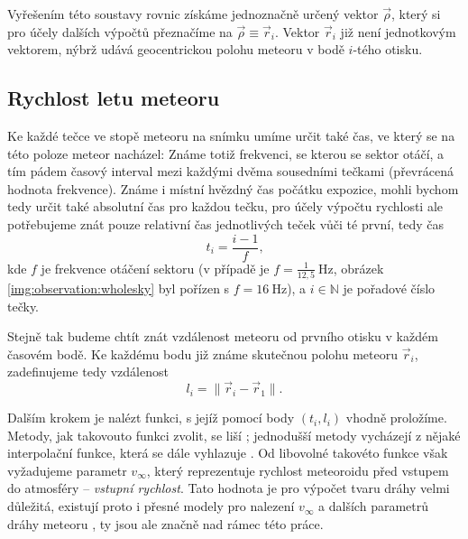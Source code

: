 Vyřešením této soustavy rovnic získáme jednoznačně určený vektor $\vec{\rho}$, který si pro účely dalších výpočtů přeznačíme na $\vec{\rho}\equiv\vec{r}_i$. Vektor $\vec{r}_i$ již není jednotkovým vektorem, nýbrž udává geocentrickou polohu meteoru v bodě $i$-tého otisku.%

\subsection{Rychlost letu meteoru}%
Ke každé tečce ve stopě meteoru na snímku umíme určit také čas, ve který se na této poloze meteor nacházel: Známe totiž frekvenci, se kterou se sektor otáčí, a tím pádem časový interval mezi každými dvěma sousedními tečkami (převrácená hodnota frekvence). Známe i místní hvězdný čas počátku expozice, mohli bychom tedy určit také absolutní čas pro každou tečku, pro účely výpočtu rychlosti ale potřebujeme znát pouze relativní čas jednotlivých teček vůči té první, tedy čas
\begin{equation}
    t_i=\frac{i-1}{f}\text{,}
\end{equation}
kde $f$ je frekvence otáčení sektoru (v případě \cite{ceplecha} je $f=\frac{1}{12{,}5}\:\text{Hz}$, obrázek \ref{img:observation:wholesky} byl pořízen s $f=16\:\text{Hz}$), a $i\in\mathbb{N}$ je pořadové číslo tečky.

Stejně tak budeme chtít znát vzdálenost meteoru od prvního otisku v každém časovém bodě. Ke každému bodu již známe skutečnou polohu meteoru $\vec{r}_i$, zadefinujeme tedy vzdálenost
\begin{equation}
    l_i=\lVert\vec{r}_i-\vec{r}_1\rVert\text{.}
\end{equation}

\medskip

Dalším krokem je nalézt funkci, s jejíž pomocí body $\left(t_i,l_i\right)$ vhodně proložíme. Metody, jak takovouto funkci zvolit, se liší \cite{ceplecha}; jednodušší metody vycházejí z nějaké interpolační funkce, která se dále vyhlazuje \cite{ceplecha}. Od libovolné takovéto funkce však vyžadujeme parametr $v_\infty$, který reprezentuje rychlost meteoroidu před vstupem do atmosféry \cite{ceplecha} -- \textit{vstupní rychlost}. Tato hodnota je pro výpočet tvaru dráhy velmi důležitá, existují proto i přesné modely pro nalezení $v_\infty$ a dalších parametrů dráhy meteoru \cite{ceplecha}\cite{singlebodymeteor}, ty jsou ale značně nad rámec této práce.

